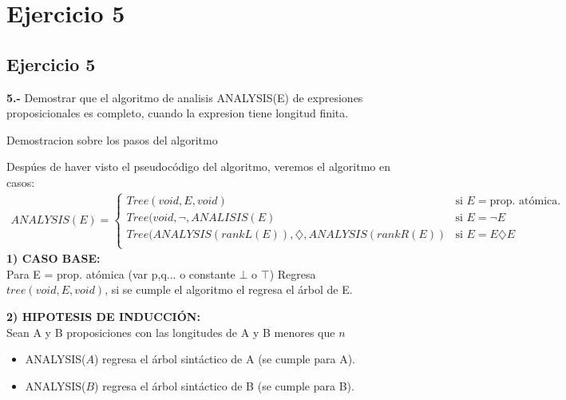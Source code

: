 \chapter*{Ejercicio 5}
\section*{Ejercicio 5}

\textbf{5.-} Demostrar que el algoritmo de analisis ANALYSIS(E) de expresiones proposicionales es completo, cuando la expresion tiene longitud finita. \\
\newline
\begin{center}
    Demostracion sobre los pasos del algoritmo
\end{center}

Despúes de haver visto el pseudocódigo del algoritmo, veremos el algoritmo en casos: \\
\begin{align*}
ANALYSIS(E) = \begin{cases}
    Tree (void,E,void)  & \text{si } E=\text{prop. atómica}. \\
    Tree (void,\neg, ANALISIS(E) & \text{si } E=\neg E \\
    Tree (ANALYSIS(rankL(E)),\diamondsuit,ANALYSIS(rankR(E)) & \text{si } E=E \diamondsuit E \\
\end{cases}
\end{align*}
\newline
\textbf{1) CASO BASE:}\\
\newline
Para E = prop. atómica (var p,q... o constante $\bot$ o $\top$)
Regresa $tree (void,E,void)$, si se cumple el algoritmo el regresa el árbol de E. \\
\newline

\textbf{2) HIPOTESIS DE INDUCCIÓN:}\\
\newline
Sean A y B proposiciones con las longitudes de A y B menores que $n$\\
\begin{itemize}
    \item ANALYSIS($A$) regresa el árbol sintáctico de A (se cumple para A).
    \item ANALYSIS($B$) regresa el árbol sintáctico de B (se cumple para B).
\end{itemize}

